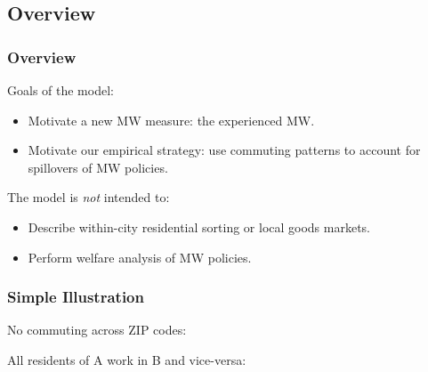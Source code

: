 
\subsection{Overview}
\begin{frame}
	\frametitle{Overview}
	
	Goals of the model:
	\begin{itemize}
		\item Motivate a new MW measure: the experienced MW.
		\item Motivate our empirical strategy: use commuting patterns to account for 
		spillovers of MW policies.
	\end{itemize}
	
	\pause
	\vspace{2mm}
	The model is \textit{not} intended to:
	\begin{itemize}
		\item Describe within-city residential sorting or local goods markets.
		\item Perform welfare analysis of MW policies.
	\end{itemize}

\end{frame}


\begin{frame}
	\frametitle{Simple Illustration}
	
	No commuting across ZIP codes:
	
	
	\pause
	\vspace{2mm}
	All residents of A work in B and vice-versa:
	
	
\end{frame}

